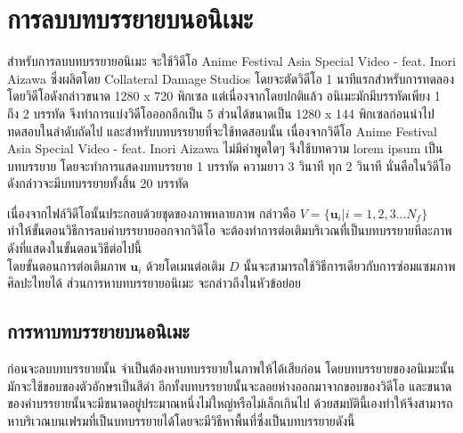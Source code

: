 \section{การลบบทบรรยายบนอนิเมะ}
\hspace{1cm} สำหรับการลบบทบรรยายอนิเมะ จะใช้วิดีโอ Anime Festival Asia Special Video - feat. Inori Aizawa ซึ่งผลิตโดย Collateral Damage Studios โดยจะตัดวิดีโอ 1 นาทีแรกสำหรับการทดลอง โดยวิดีโอดังกล่าวขนาด 1280 x 720 พิกเซล แต่เนื่องจากโดยปกติแล้ว อนิเมะมักมีบรรทัดเพียง 1 ถึง 2 บรรทัด จึงทำการแบ่งวิดีโอออกอีกเป็น 5 ส่วนได้ขนาดเป็น 1280 x 144 พิกเซลก่อนนำไปทดสอบในลำดับถัดไป
\hspace{1cm} และสำหรับบทบรรยายที่จะใช้ทดสอบนั้น เนื่องจากวิดีโอ Anime Festival Asia Special Video - feat. Inori Aizawa ไม่มีคำพูดใดๆ จึงใช้บทความ lorem ipsum เป็นบทบรรยาย โดยจะทำการแสดงบทบรรยาย 1 บรรทัด ความยาว 3 วินาที ทุก 2 วินาที นั่นคือในวิดีโอดังกล่าวจะมีบทบรรยายทั้งสิ้น 20 บรรทัด	
	

    

\hspace{1cm}เนื่องจากไฟล์วิดีโอนั้นประกอบด้วยชุดของภาพหลายภาพ กล่าวคือ $V = \{\boldsymbol{u}_i| i = 1,2,3 ... N_f\}$ ทำให้ขั้นตอนวิธีการลบคำบรรยายออกจากวิดีโอ จะต้องทำการต่อเติมบริเวณที่เป็นบทบรรยายทีละภาพ ดังที่แสดงในขั้นตอนวิธีต่อไปนี้ \\
	


\vspace{1cm}
\hspace{1cm} โดยขั้นตอนการต่อเติมภาพ $\boldsymbol{u}_i$ ด้วยโดเมนต่อเติม $D$ นั้นจะสามารถใช้วิธีการเดียวกับการซ่อมแซมภาพศิลปะไทยได้ ส่วนการหาบทบรรยายอนิเมะ จะกล่าวถึงในหัวข้อย่อย

\subsection{การหาบทบรรยายบนอนิเมะ}	
\hspace{1cm}ก่อนจะลบบทบรรยายนั้น จำเป็นต้องหาบทบรรยายในภาพให้ได้เสียก่อน โดยบทบรรยายของอนิเมะนั้น มักจะใช้ขอบของตัวอักษรเป็นสีดำ อีกทั้งบทบรรยายนั้นจะลอยห่างออกมาจากขอบของวิดีโอ และขนาดของคำบรรยายนั้นจะมีขนาดอยู่ประมาณหนึ่งไม่ใหญ่หรือไม่เล็กเกินไป ด้วยสมบัตินี้เองทำให้จึงสามารถหาบริเวณบนเฟรมที่เป็นบทบรรยายได้โดยจะมีวิธีหาพื้นที่ซึ่งเป็นบทบรรยายดังนี้
	
\vspace{1cm}


    
